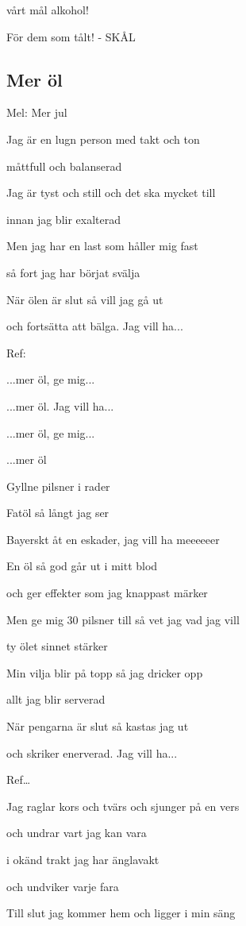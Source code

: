vårt mål alkohol!

För dem som tålt! - SKÅL 


\subsection{\textbf{Mer öl}}

Mel: Mer jul\bigskip

Jag är en lugn person med takt och ton

måttfull och balanserad

Jag är tyst och still och det ska mycket till

innan jag blir exalterad

Men jag har en last som håller mig fast

så fort jag har börjat svälja

När ölen är slut så vill jag gå ut

och fortsätta att bälga. Jag vill ha...\bigskip

Ref:

...mer öl, ge mig...

...mer öl. Jag vill ha...

...mer öl, ge mig...

...mer öl

Gyllne pilsner i rader

Fatöl så långt jag ser

Bayerskt åt en eskader, jag vill ha meeeeeer\bigskip

En öl så god går ut i mitt blod

och ger effekter som jag knappast märker

Men ge mig 30 pilsner till så vet jag vad jag vill

ty ölet sinnet stärker

Min vilja blir på topp så jag dricker opp

allt jag blir serverad

När pengarna är slut så kastas jag ut

och skriker enerverad. Jag vill ha...\bigskip

Ref…\bigskip

Jag raglar kors och tvärs och sjunger på en vers

och undrar vart jag kan vara

i okänd trakt jag har änglavakt

och undviker varje fara

Till slut jag kommer hem och ligger i min säng

